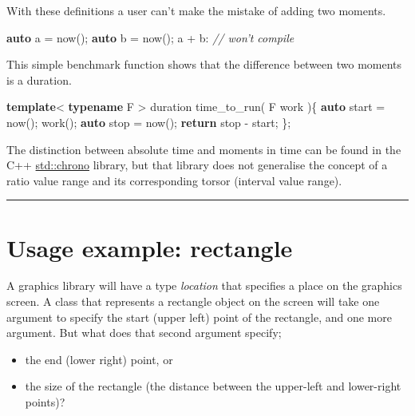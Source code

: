 \documentclass[]{article}
\newenvironment{Shaded}{}{}
\newcommand{\CommentTok}[1]{\textcolor[rgb]{0.38,0.63,0.69}{\textit{#1}}}
\newcommand{\ControlFlowTok}[1]{\textcolor[rgb]{0.00,0.44,0.13}{\textbf{#1}}}
\newcommand{\KeywordTok}[1]{\textcolor[rgb]{0.00,0.44,0.13}{\textbf{#1}}}
\newcommand{\NormalTok}[1]{#1}
\begin{document}
With these definitions a user can't make the mistake of adding two
moments.

\begin{Shaded}
\begin{Highlighting}[]
\KeywordTok{auto}\NormalTok{ a = now();}
\KeywordTok{auto}\NormalTok{ b = now();}
\NormalTok{a + b: }\CommentTok{// won't compile}
\end{Highlighting}
\end{Shaded}

This simple benchmark function shows that the difference between two
moments is a duration.

\begin{Shaded}
\begin{Highlighting}[]
\KeywordTok{template}\NormalTok{< }\KeywordTok{typename}\NormalTok{ F >}
\NormalTok{duration time_to_run( F work )\{}
   \KeywordTok{auto}\NormalTok{ start = now();}
\NormalTok{   work();}
   \KeywordTok{auto}\NormalTok{ stop = now();}
   \ControlFlowTok{return}\NormalTok{ stop - start;}
\NormalTok{\};   }
\end{Highlighting}
\end{Shaded}

The distinction between absolute time and moments in time can be found
in the C++ \href{https://en.cppreference.com/w/cpp/chrono}{std::chrono}
library, but that library does not generalise the concept of a ratio
value range and its corresponding torsor (interval value range).

\begin{center}\rule{0.5\linewidth}{\linethickness}\end{center}

\hypertarget{usage-example-rectangle}{%
\section{Usage example: rectangle}\label{usage-example-rectangle}}

A graphics library will have a type \emph{location} that specifies a
place on the graphics screen. A class that represents a rectangle object
on the screen will take one argument to specify the start (upper left)
point of the rectangle, and one more argument. But what does that second
argument specify;

\begin{itemize}
\item
  the end (lower right) point, or
\item
  the size of the rectangle (the distance between the upper-left and
  lower-right points)?
\end{itemize}
\end{document}
